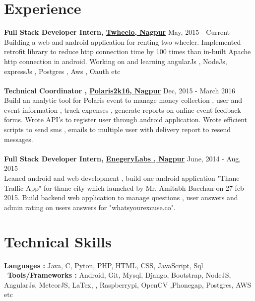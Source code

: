 \documentclass[margin, centered]{res}
\begin{document}
\begin{resume}
\section{Experience}
\textbf{Full Stack Developer Intern, \href{http://www.twheelo.com}{Twheelo, Nagpur}} \hfill May, 2015 - Current\\
Building a web and android application for renting two wheeler. 
Implemented retrofit library to reduce http connection time by 100 times than in-built Apache http connection in android. 
Working on and learning  angularJs , NodeJs, expressJs , Postgres , Aws , Oauth  etc
\\
\\
\textbf{Technical Coordinator , \href{http://www.polaris2k16.in/}{Polaris2k16, Nagpur}} \hfill Dec, 2015 - March 2016 \\
Build an analytic tool for Polaris event  to manage money collection , user and event information , track expenses , 
generate reports on online event feedback forms.  
Wrote API's to register user through android application.
Wrote efficient scripts to send sms , emails to multiple user with delivery report to resend messages.\\
\\
\textbf{Full Stack Developer Intern, \href{http://www.energylabs.in/}{EnegeryLabs , Nagpur}}
 \hfill June, 2014 - Aug, 2015 \\ 
Leaned android and web development , build one android application "Thane Traffic App" for thane city 
which  launched by Mr. Amitabh Bacchan on 27 feb 2015. 
Build backend web application to manage questions , user answers and admin rating on users answers 
for "whatsyourexcuse.co".
\\

\section{Technical Skills}
\textbf{Languages : }
	Java, C, Pyton, PHP, HTML, CSS, JavaScript,	Sql \\
	\
\textbf{Tools/Frameworks : }
Android, Git, Mysql, Django, Bootstrap, NodeJS, AngularJs, MeteorJS, LaTex,
, Raspberrypi, OpenCV ,Phonegap, Postgres, AWS etc
\\	
	

\end{resume}
\end{document}
